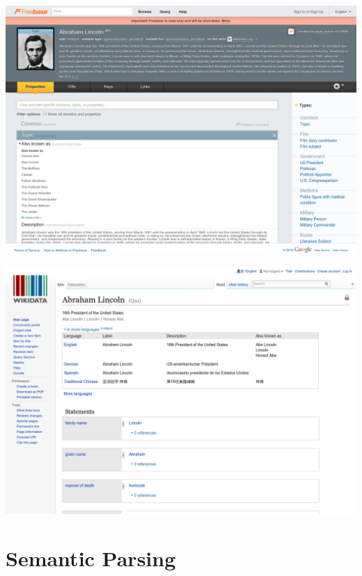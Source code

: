 \documentclass{beamer}
\begin{document}
\begin{frame}
  \begin{center}
    \includegraphics[width=\textwidth]{freebaseabe}
  \end{center}
\end{frame}

\begin{frame}
  \begin{center}
    \includegraphics[width=\textwidth]{wikiabe}
  \end{center}
\end{frame}


\section{Semantic Parsing}
\end{document}
